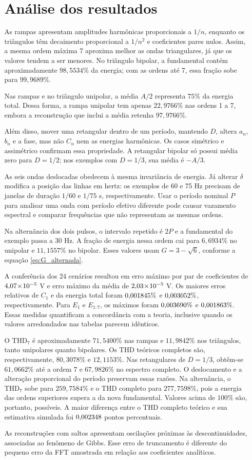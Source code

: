 \section{Análise dos resultados}

As rampas apresentam amplitudes harmônicas proporcionais a $1/n$,
enquanto os triângulos têm decaimento proporcional a $1/n^2$ e
coeficientes pares nulos. Assim, a mesma ordem máxima 7 aproxima
melhor as ondas triangulares, já que os valores tendem a ser menores. No triângulo bipolar, a fundamental
contém aproximadamente $98{,}5534\%$ da energia; com as ordens até 7,
essa fração sobe para $99{,}9689\%$.

Nas rampas e no triângulo unipolar, a média $A/2$ representa
$75\%$ da energia total. Dessa forma, a rampa unipolar tem apenas
$22{,}9766\%$ nas ordens 1 a 7, embora a reconstrução que inclui
a média retenha $97{,}9766\%$.

Além disso, mover uma retangular dentro de um período, mantendo $D$, altera
$a_n$, $b_n$ e a fase, mas não $C_n$ nem as energias harmônicas.
Os casos simétrico e assimétrico confirmam essa propriedade.
A retangular bipolar só possui média zero para $D=1/2$; nos exemplos
com $D=1/3$, sua média é $-A/3$.

As seis ondas deslocadas obedecem à mesma invariância de energia.
Já alterar $\delta$ modifica a posição das linhas em hertz:
os exemplos de 60 e 75 Hz precisam de janelas de duração $1/60$ e
$1/75$ s, respectivamente. Usar o período nominal $P$ para analisar
uma onda com período efetivo diferente pode causar vazamento
espectral e comparar frequências que não representam as mesmas ordens.

Na alternância dos dois pulsos, o intervalo repetido é $2P$ e a
fundamental do exemplo passa a 30 Hz. A fração de energia nessa
ordem cai para $6{,}6934\%$ no unipolar e $11{,}1557\%$ no bipolar.
Esses valores usam $G=3-\sqrt6$, conforme a
equação \ref{eq:G_alternada}.

A conferência dos 24 cenários resultou em erro máximo por par de
coeficientes de $4{,}07\!\times\!10^{-5}$ V e erro máximo da média de
$2{,}03\!\times\!10^{-5}$ V. Os maiores erros relativos de $C_1$ e da
energia total foram $0{,}001845\%$ e $0{,}003052\%$,
respectivamente. Para $E_1$ e $E_{1:7}$, os máximos foram
$0{,}003690\%$ e $0{,}001863\%$. Essas medidas
quantificam a concordância com a teoria, inclusive quando os
valores arredondados nas tabelas parecem idênticos.

O $\mathrm{THD}_7$ é aproximadamente $71{,}5400\%$ nas rampas e
$11{,}9842\%$ nos triângulos, tanto unipolares quanto bipolares.
Os THD teóricos completos são, respectivamente, $80{,}3078\%$
e $12{,}1153\%$. Nas retangulares de $D=1/3$, obtêm-se
$61{,}0662\%$ até a ordem 7 e $67{,}9826\%$ no espectro completo.
O deslocamento e a alteração proporcional do período preservam
essas razões. Na alternância, o $\mathrm{THD}_7$ sobe para
$259{,}7584\%$ e o THD completo para $277{,}7598\%$, pois a
energia das ordens superiores supera a da nova fundamental.
Valores acima de $100\%$ são, portanto, possíveis. A maior
diferença entre o THD completo teórico e sua estimativa simulada
foi $0{,}002348$ pontos percentuais.

As reconstruções com saltos apresentam oscilações próximas às
descontinuidades, associadas ao fenômeno de Gibbs. Esse erro de
truncamento é diferente do pequeno erro da FFT amostrada em relação
aos coeficientes analíticos.




